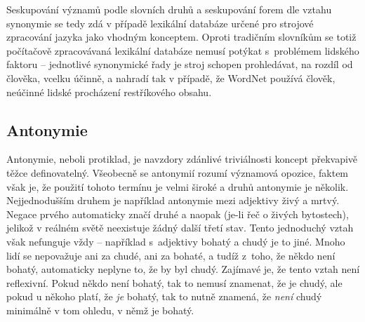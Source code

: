 \documentclass[a4paper, 11pt, oneside, showtrims]{book}
\newcommand\ex{\textsf}
\begin{document}
					Seskupování významů podle slovních druhů a seskupování forem dle vztahu synonymie se tedy zdá v případě lexikální databáze určené pro strojové zpracování jazyka jako vhodným konceptem. Oproti tradičním slovníkům se totiž počítačově zpracovávaná lexikální databáze nemusí potýkat s~problémem lidského faktoru -- jednotlivé synonymické řady je stroj schopen prohledávat, na rozdíl od člověka, vcelku účinně, a nahradí tak v případě, že WordNet používá člověk, neúčinné lidské procházení restříkového obsahu.

					

				\subsection{Antonymie}

					Antonymie, neboli protiklad, je navzdory zdánlivé triviálnosti koncept překvapivě těžce definovatelný. Všeobecně se antonymií rozumí významová opozice, faktem však je, že použití tohoto termínu je velmi široké a druhů antonymie je několik. Nejjednodušším druhem je například antonymie mezi adjektivy \ex{živý} a \ex{mrtvý}. Negace prvého automaticky značí druhé a naopak (je-li řeč o živých bytostech), jelikož v reálném světě neexistuje žádný další třetí stav. Tento jednoduchý vztah však nefunguje vždy -- například s~adjektivy \ex{bohatý} a \ex{chudý} je to jiné. Mnoho lidí se nepovažuje ani za chudé, ani za bohaté, a tudíž z~toho, že někdo není bohatý, automaticky neplyne to, že by byl chudý. \parencite{miller1990introduction} Zajímavé je, že tento vztah není reflexivní. Pokud někdo není bohatý, tak to nemusí znamenat, že je chudý, ale pokud u někoho platí, že \textit{je} bohatý, tak to nutně znamená, že \textit{není} chudý minimálně v tom ohledu, v němž je bohatý. \parencite{paradis2006antonymy} 
\end{document}
